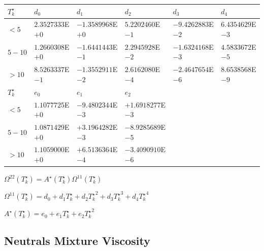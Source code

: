 \documentclass{warpdoc}
\renewcommand{\fontsizetable}{\footnotesize\scalefont{1.0}}
\begin{document}
\begin{table}[t]
\fontsizetable
\begin{center}
  \begin{threeparttable}
    \fontsizetable
    \begin{tabular*}{\textwidth}{@{\extracolsep{\fill}}llllll}
      \toprule
$T^\star_k$& $d_0$          & $d_1$           & $d_2$          & $d_3$           & $d_4$ \\
\midrule
$<5$       & $2.3527333$E$+0$ & $-1.3589968$E$+0$ & $5.2202460$E$-1$ & $-9.4262883$E$-2$ & $6.4354629$E$-3$ \\
$5-10$     & $1.2660308$E$+0$ & $-1.6441443$E$-1$ & $2.2945928$E$-2$ & $-1.6324168$E$-3$ & $4.5833672$E$-5$ \\
$>10$      & $8.5263337$E$-1$ & $-1.3552911$E$-2$ & $2.6162080$E$-4$ & $-2.4647654$E$-6$ & $8.6538568$E$-9$ \\
\midrule
$T^\star_k$& $e_0$          & $e_1$           & $e_2$           &~&~\\
\midrule
$<5$       & $1.1077725$E$+0$ & $-9.4802344$E$-3$ & $+1.6918277$E$-3$ &~&~ \\
$5-10$     & $1.0871429$E$+0$ & $+3.1964282$E$-3$ & $-8.9285689$E$-5$ &~& ~\\
$>10$      & $1.1059000$E$+0$ & $+6.5136364$E$-4$ & $-3.4090910$E$-6$ &~&~ \\
      \bottomrule
    \end{tabular*}
    \label{tab:dl:Omega}
    \begin{tablenotes}
      \item  $\Omega^{22}(T^\star_k)= A^\star (T^\star_k) \Omega^{11}(T^\star_k)$ 
      \item  $\Omega^{11}(T^\star_k)=d_0+d_1 {T^\star_k}+d_2 {T^\star_k}^2+d_3 {T^\star_k}^3+d_4 {T^\star_k}^4$ 
      \item  $A^\star (T^\star_k)=e_0+e_1 {T^\star_k}+e_2 {T^\star_k}^2$ 
    \end{tablenotes}
  \end{threeparttable}
\end{center}
\end{table}
%

\subsection{Neutrals Mixture Viscosity}
\end{document}
